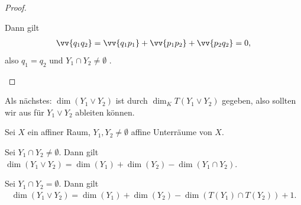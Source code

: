 \begin{proof}
\begin{proofdescription}
\begin{figure}[H]
             \label{fig:verbindungsraum_translationen_schnitt_leer_verbindungslinie_nicht_in_translationen}
         \end{figure}
         Dann gilt
         \begin{align*}
             \vv{q_1 q_2}=\vv{q_1 p_1}+\vv{p_1 p_2}+\vv{p_2 q_2}=0,
         \end{align*}
         also \( q_1=q_2 \) und \( Y_1\cap Y_2\neq \emptyset \) \contra.
    \end{proofdescription}
\end{proof}
Als nächstes: \( \dim(Y_1\vee Y_2) \) ist durch \( \dim_K T(Y_1\vee Y_2) \) gegeben, also sollten wir aus  für \( Y_1\vee Y_2 \) ableiten können.
\begin{lemma}\label{verbindungsraum:dimension}
    Sei \( X \) ein affiner Raum, \( Y_1, Y_2\neq \emptyset \) affine Unterräume von \( X \).
    \begin{eigenschaftenenumerate}
        \item\label{verbindungsraum:dimension:schnitt_nicht_leer} Sei \( Y_1\cap Y_2\neq \emptyset \).
         Dann gilt \( \dim(Y_1\vee Y_2)=\dim(Y_1)+\dim(Y_2)-\dim(Y_1\cap Y_2) \).
        \item\label{verbindungsraum:dimension:schnitt_leer} Sei \( Y_1\cap Y_2=\emptyset \).
        Dann gilt
        \begin{align*}
            \dim(Y_1\vee Y_2)=\dim(Y_1)+\dim(Y_2)-\dim(T(Y_1)\cap T(Y_2))+1.
        \end{align*}
    \end{eigenschaftenenumerate}
    
\end{lemma}
